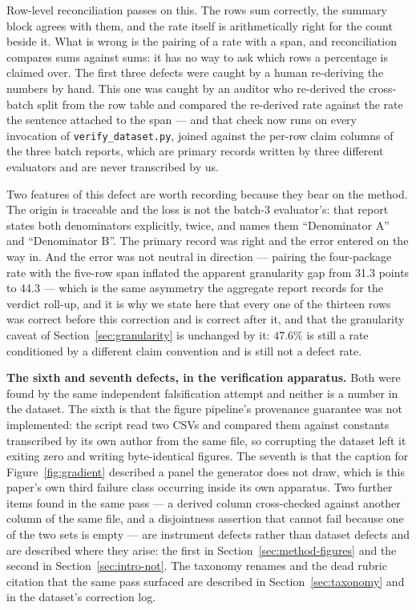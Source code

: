 \documentclass[sigconf,review]{acmart}
\begin{document}
Row-level reconciliation passes on this. The rows sum correctly, the summary
block agrees with them, and the rate itself is arithmetically right for the
count beside it. What is wrong is the pairing of a rate with a span, and
reconciliation compares sums against sums: it has no way to ask which rows a
percentage is claimed over. The first three defects were caught by a human
re-deriving the numbers by hand. This one was caught by an auditor who
re-derived the cross-batch split from the row table and compared the
re-derived rate against the rate the sentence attached to the span --- and that
check now runs on every invocation of \texttt{verify\_dataset.py}, joined
against the per-row claim columns of the three batch reports, which are primary
records written by three different evaluators and are never transcribed by us.

Two features of this defect are worth recording because they bear on the
method. The origin is traceable and the loss is not the batch-3 evaluator's:
that report states both denominators explicitly, twice, and names them
``Denominator A'' and ``Denominator B''. The primary record was right and the
error entered on the way in. And the error was not neutral in direction ---
pairing the four-package rate with the five-row span inflated the apparent
granularity gap from 31.3 points to 44.3 --- which is the same asymmetry the
aggregate report records for the verdict roll-up, and it is why we state here
that every one of the thirteen rows was correct before this correction and is
correct after it, and that the granularity caveat of
Section~\ref{sec:granularity} is unchanged by it: $47.6\%$ is still a rate
conditioned by a different claim convention and is still not a defect rate.

\textbf{The sixth and seventh defects, in the verification apparatus.} Both
were found by the same independent falsification attempt and neither is a
number in the dataset. The sixth is that the figure pipeline's provenance
guarantee was not implemented: the script read two CSVs and compared them
against constants transcribed by its own author from the same file, so
corrupting the dataset left it exiting zero and writing byte-identical
figures. The seventh is that the caption for Figure~\ref{fig:gradient}
described a panel the generator does not draw, which is this paper's own third
failure class occurring inside its own apparatus. Two further items found in the
same pass --- a derived column cross-checked against another column of the same
file, and a disjointness assertion that cannot fail because one of the two sets
is empty --- are instrument defects rather than dataset defects and are
described where they arise: the first in Section~\ref{sec:method-figures} and
the second in Section~\ref{sec:intro-not}. The taxonomy renames and the dead
rubric citation that the same pass surfaced are described in
Section~\ref{sec:taxonomy} and in the dataset's correction log.
\end{document}
